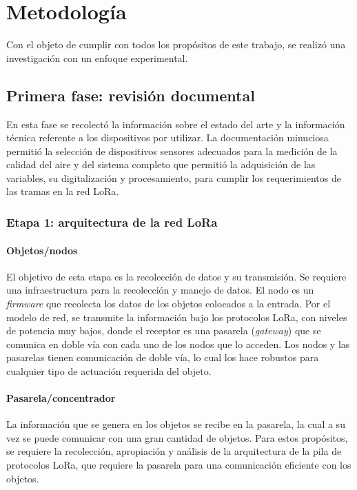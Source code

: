 \chapter{Metodología}
Con el objeto de cumplir con todos los propósitos de este trabajo, se realizó una investigación con un enfoque experimental.

\section{Primera fase: revisión documental}

En esta fase se recolectó la información sobre el estado del arte y la información técnica referente a los dispositivos por utilizar. La documentación minuciosa permitió la selección de dispositivos sensores adecuados para la medición de la calidad del aire y del sistema completo que permitió la adquisición de las variables, su digitalización y procesamiento, para cumplir los requerimientos de las tramas en la red LoRa. 

\subsection{Etapa 1: arquitectura de la  red LoRa}
\subsubsection{Objetos/nodos }
El objetivo de esta etapa es la recolección de datos y su transmisión. Se requiere una infraestructura para la recolección y manejo de datos. El nodo es un \emph{firmware} que recolecta los datos de los objetos colocados a la entrada. Por el modelo de red, se transmite la información bajo los protocolos LoRa, con niveles de potencia muy bajos, donde el receptor es una pasarela (\emph{gateway}) que se comunica en doble vía con cada uno de los nodos que lo acceden. Los nodos y las pasarelas tienen comunicación de doble vía, lo cual los hace robustos para cualquier tipo de actuación requerida del objeto.

\subsubsection{Pasarela/concentrador}
La información que se genera en los objetos se recibe en la pasarela, la cual a su vez se puede comunicar con una gran cantidad de objetos. Para estos propósitos, se requiere la recolección, apropiación y análisis de la arquitectura de la pila de protocolos LoRa, que requiere la pasarela para una comunicación eficiente con los objetos. 

